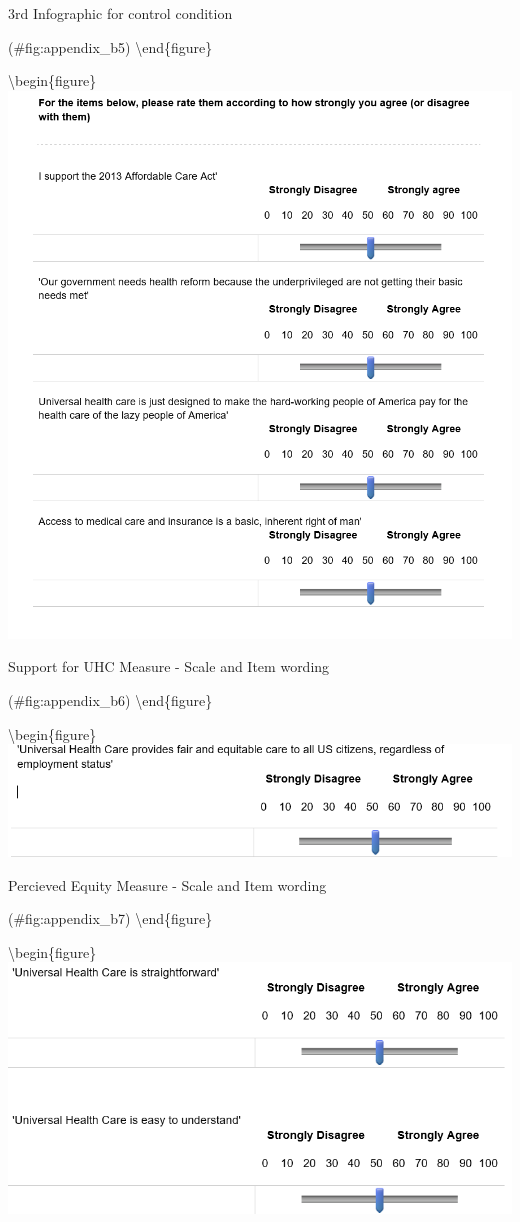 \documentclass[
  english,
  man]{apa6}
\begin{document}
\caption{3rd Infographic for control condition}

(\#fig:appendix\_b5)
\textbackslash end\{figure\}

\textbackslash begin\{figure\}
\includegraphics[width=1\linewidth]{appendix_b_6}

\caption{Support for UHC Measure - Scale and Item wording}

(\#fig:appendix\_b6)
\textbackslash end\{figure\}

\textbackslash begin\{figure\}
\includegraphics[width=1\linewidth]{appendix_b_7}

\caption{Percieved Equity Measure - Scale and Item wording}

(\#fig:appendix\_b7)
\textbackslash end\{figure\}

\textbackslash begin\{figure\}
\includegraphics[width=1\linewidth]{appendix_b_8}
\end{document}
